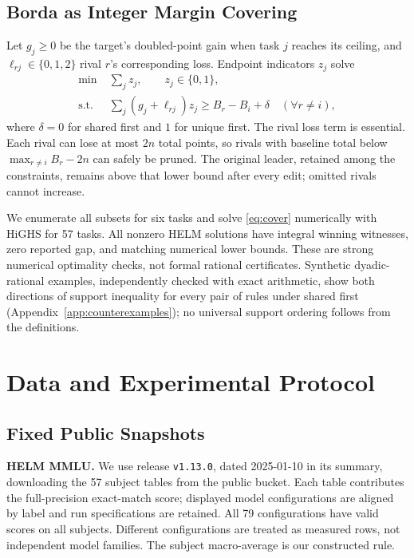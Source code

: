 \documentclass{article}
\begin{document}
\subsection{Borda as Integer Margin Covering}
Let $g_j\ge0$ be the target's doubled-point gain when task $j$ reaches its ceiling, and $\ell_{rj}\in\{0,1,2\}$ rival $r$'s corresponding loss. Endpoint indicators $z_j$ solve
\begin{align}
 \min\;&\sum_jz_j,\qquad z_j\in\{0,1\},\nonumber\\
 \text{s.t. }&\sum_j(g_j+\ell_{rj})z_j\ge B_r-B_i+\delta\quad(\forall r\ne i),
 \label{eq:cover}
\end{align}
where $\delta=0$ for shared first and $1$ for unique first. The rival loss term is essential. Each rival can lose at most $2n$ total points, so rivals with baseline total below $\max_{r\ne i} B_r-2n$ can safely be pruned. The original leader, retained among the constraints, remains above that lower bound after every edit; omitted rivals cannot increase.

We enumerate all subsets for six tasks and solve \eqref{eq:cover} numerically with HiGHS for 57 tasks. All nonzero HELM solutions have integral winning witnesses, zero reported gap, and matching numerical lower bounds. These are strong numerical optimality checks, not formal rational certificates. Synthetic dyadic-rational examples, independently checked with exact arithmetic, show both directions of support inequality for every pair of rules under shared first (Appendix~\ref{app:counterexamples}); no universal support ordering follows from the definitions.

\section{Data and Experimental Protocol}
\subsection{Fixed Public Snapshots}
\textbf{HELM MMLU.} We use release \texttt{v1.13.0}, dated 2025-01-10 in its summary, downloading the 57 subject tables from the public bucket. Each table contributes the full-precision exact-match score; displayed model configurations are aligned by label and run specifications are retained. All 79 configurations have valid scores on all subjects. Different configurations are treated as measured rows, not independent model families. The subject macro-average is our constructed rule.
\end{document}
